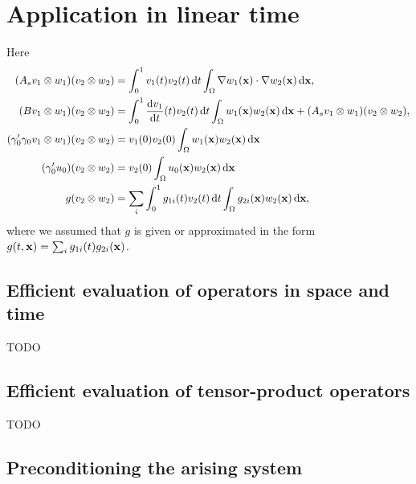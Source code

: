 \documentclass[11pt,a4paper,oneside,english]{amsart}
\numberwithin{equation}{section}
\numberwithin{theorem}{section}
\theoremstyle{definition}
\newcommand{\jw}[1]{{\color{red}{JW: #1}}}
\begin{document}
\section{Application in linear time}
\jw{XYZ inleiding.} Here
\begin{align*}
(A_s v_1 \otimes w_1)(v_2 \otimes w_2)&=\int_0^1 v_1(t) v_2(t)\dif t \int_\Omega \nabla w_1({\bf x})\cdot  \nabla w_2({\bf x}) \dif{\bf x},\\
(B v_1 \otimes w_1)(v_2 \otimes w_2)&=\int_0^1 \frac{\dif v_1}{\dif t}(t) v_2(t)\dif t \int_\Omega w_1({\bf x}) w_2({\bf x}) \dif {\bf x}+(A_s v_1 \otimes w_1)(v_2 \otimes w_2),\\
(\gamma_0' \gamma_0 v_1 \otimes w_1)(v_2 \otimes w_2)&=
v_1(0) v_2(0)\int_\Omega w_1({\bf x}) w_2({\bf x}) \dif {\bf x}\\
(\gamma_0' u_0)(v_2 \otimes w_2)&=v_2(0) \int_\Omega u_0({\bf x}) w_2({\bf x}) \dif {\bf x}\\
g(v_2 \otimes w_2)&=\sum_i \int_0^1g_{1i}(t) v_2(t)\dif t \int_\Omega g_{2i}({\bf x}) w_2({\bf x}) \dif  {\bf x},
\end{align*}
where we assumed that $g$ is given or approximated in the form $g(t,{\bf x})=\sum_i g_{1i}(t) g_{2i}({\bf x})$.
\subsection{Efficient evaluation of operators in space and time}
TODO
\subsection{Efficient evaluation of tensor-product operators}
TODO
\subsection{Preconditioning the arising system}
\jw{introduce operator preconditioning}
\end{document}
